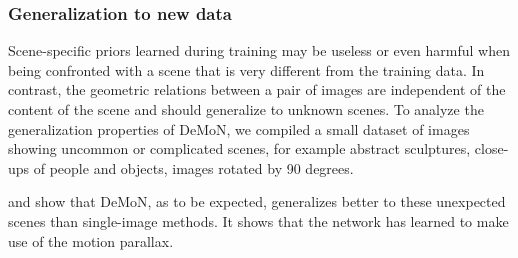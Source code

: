 \documentclass[10pt,twocolumn,letterpaper]{article}
\begin{document}
\vspace{-0.3em}%
\subsubsection{Generalization to new data}
\label{sec:generalization}


Scene-specific priors learned during training may be useless or even harmful when being confronted with a scene that is very different from the training data. In contrast, the geometric relations between a pair of images are independent of the content of the scene and should generalize to unknown scenes. 
To analyze the generalization properties of DeMoN, we compiled a small dataset of images showing uncommon or complicated scenes, for example abstract sculptures, close-ups of people and objects, images rotated by 90 degrees.%

 and  show that DeMoN, as to be expected, generalizes better to these unexpected scenes than single-image methods. It shows that the network has learned to make use of the motion parallax. 
\end{document}
